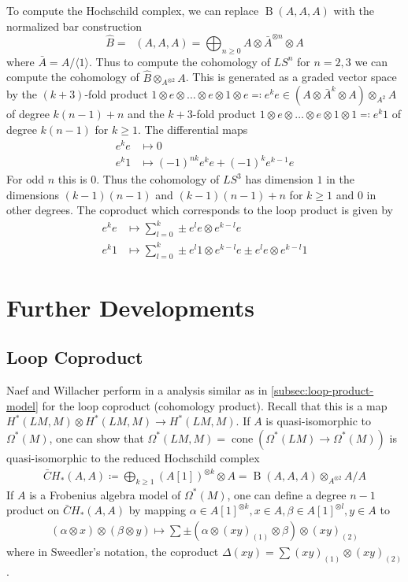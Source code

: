 \documentclass{scrartcl}
\theoremstyle{plain}
\theoremstyle{definition}
\DeclareMathOperator{\cone}{cone}
\newcommand{\defeq}{\coloneqq}
\newcommand{\eqdef}{\eqqcolon}
\DeclareMathOperator{\BC}{B}
\DeclareMathOperator{\nBC}{\hat B}
\begin{document}
To compute the Hochschild complex, we can replace $\BC(A, A, A)$ with the normalized bar construction $$\hat B = \nBC(A, A, A) = \bigoplus_{n\geq 0} A\otimes \bar A^{\otimes n} \otimes A$$
where $\bar A = A/\langle 1\rangle$. Thus to compute the cohomology of $LS^n$ for $n=2,3$ we can compute the cohomology of $\hat B\otimes_{A^{\otimes 2}} A$. This is generated as a graded vector space by the $(k+3)$-fold product $1 \otimes e\otimes\dots\otimes e\otimes 1 \otimes e \eqdef e^{k} e\in (A\otimes \bar A^{k}\otimes A)\otimes_{A^2} A$ of degree $k(n-1)+n$ and the $k+3$-fold product $1\otimes e\otimes\dots\otimes e\otimes 1 \otimes 1 \eqdef e^{k} 1$ of degree $k(n-1)$ for $k\geq 1$. The differential maps 
\begin{align*}
    e^k e &\mapsto 0 \\
    e^k 1 &\mapsto (-1)^{nk} e^{k} e + (-1)^{k} e^{k-1} e
\end{align*}
For odd $n$ this is $0$. Thus the cohomology of $LS^3$ has dimension $1$ in the dimensions $(k-1)(n-1)$ and $(k-1)(n-1)+n$ for $k\geq 1$ and $0$ in other degrees. The coproduct which corresponds to the loop product is given by 
\begin{align*}
    e^{k} e &\mapsto \sum_{l=0}^k \pm e^{l} e \otimes e^{k-l} e \\
    e^{k} 1 &\mapsto \sum_{l=0}^k \pm e^{l} 1 \otimes e^{k-l} e \pm e^{l} e \otimes e^{k-l} 1
\end{align*}



\section{Further Developments}
\subsection{Loop Coproduct}
Naef and Willacher perform in \cite{naef2019string} a analysis similar as in \cref{subsec:loop-product-model} for the loop coproduct (cohomology product). Recall that this is a map $H^*(LM, M)\otimes H^*(LM, M)\to H^*(LM, M)$. If $A$ is quasi-isomorphic to $\Omega^*(M)$, one can show that $\Omega^*(LM, M) = \cone(\Omega^*(LM)\to \Omega^*(M))$ is quasi-isomorphic to the reduced Hochschild complex
\begin{align*}
\bar CH_*(A, A) \defeq \bigoplus_{k\geq 1} (A[1])^{\otimes  k} \otimes A = \BC(A, A, A)\otimes_{A^{\otimes 2}} A / A
\end{align*}
If $A$ is a Frobenius algebra model of $\Omega^*(M)$, one can define a degree $n-1$ product on $\bar CH_*(A, A)$ by mapping $\alpha\in A[1]^{\otimes k}, x\in A, \beta\in A[1]^{\otimes l}, y\in A$ to 
\begin{align*}
    (\alpha\otimes x)\otimes (\beta\otimes y)  \mapsto \sum \pm (\alpha \otimes (xy)_{(1)}\otimes\beta)\otimes (xy)_{(2)}
\end{align*}
where in Sweedler's notation, the coproduct $\Delta(xy) = \sum (xy)_{(1)} \otimes (xy)_{(2)}$.
\end{document}
